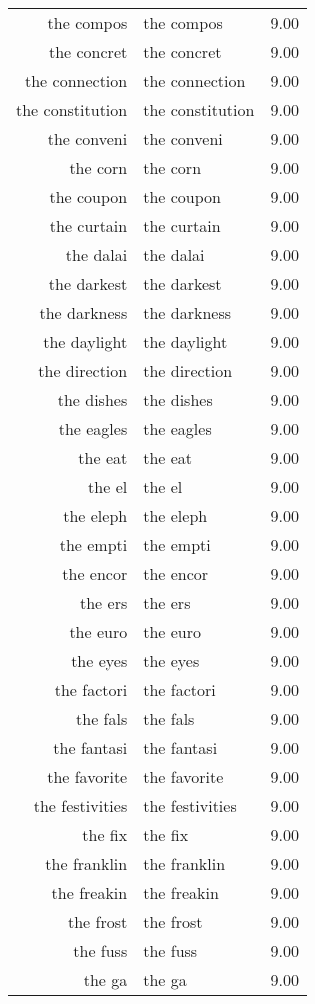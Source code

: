 \begin{table}[ht]
\begin{tabular}{rlr}
  the compos & the compos & 9.00 \\ 
  the concret & the concret & 9.00 \\ 
  the connection & the connection & 9.00 \\ 
  the constitution & the constitution & 9.00 \\ 
  the conveni & the conveni & 9.00 \\ 
  the corn & the corn & 9.00 \\ 
  the coupon & the coupon & 9.00 \\ 
  the curtain & the curtain & 9.00 \\ 
  the dalai & the dalai & 9.00 \\ 
  the darkest & the darkest & 9.00 \\ 
  the darkness & the darkness & 9.00 \\ 
  the daylight & the daylight & 9.00 \\ 
  the direction & the direction & 9.00 \\ 
  the dishes & the dishes & 9.00 \\ 
  the eagles & the eagles & 9.00 \\ 
  the eat & the eat & 9.00 \\ 
  the el & the el & 9.00 \\ 
  the eleph & the eleph & 9.00 \\ 
  the empti & the empti & 9.00 \\ 
  the encor & the encor & 9.00 \\ 
  the ers & the ers & 9.00 \\ 
  the euro & the euro & 9.00 \\ 
  the eyes & the eyes & 9.00 \\ 
  the factori & the factori & 9.00 \\ 
  the fals & the fals & 9.00 \\ 
  the fantasi & the fantasi & 9.00 \\ 
  the favorite & the favorite & 9.00 \\ 
  the festivities & the festivities & 9.00 \\ 
  the fix & the fix & 9.00 \\ 
  the franklin & the franklin & 9.00 \\ 
  the freakin & the freakin & 9.00 \\ 
  the frost & the frost & 9.00 \\ 
  the fuss & the fuss & 9.00 \\ 
  the ga & the ga & 9.00 \\ 

\end{tabular}
\end{table}
